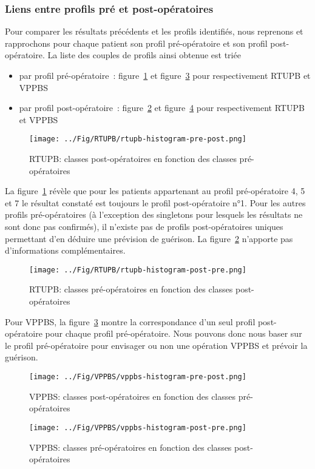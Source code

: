 %

\subsubsection{Liens entre profils pré et post-opératoires}

Pour comparer les résultats précédents et les profils identifiés, nous reprenons et rapprochons pour chaque patient son profil pré-opératoire et son profil post-opératoire. La liste des couples de profils ainsi obtenue
est triée
\begin{itemize}
 \item  par profil pré-opératoire~: figure~\ref{fig-rtupb-histogram} et figure~\ref{fig-vppbs-histogram} pour respectivement RTUPB et VPPBS
 \item  par profil post-opératoire~: figure~\ref{fig-rtupb-histogram2} et figure~\ref{fig-vppbs-histogram2} pour respectivement RTUPB et VPPBS
\end{itemize}

\begin{figure}[H]
\centering
\texttt{[image: ../Fig/RTUPB/rtupb-histogram-pre-post.png]}
\caption{RTUPB: classes post-opératoires en fonction des classes pré-opératoires}
\label{fig-rtupb-histogram}
\end{figure}

La figure~\ref{fig-rtupb-histogram} révèle que pour les patients appartenant au profil pré-opératoire 4, 5 et 7 le résultat constaté est toujours le profil post-opératoire n°1.  Pour les autres profils pré-opératoires (à l'exception des singletons pour lesquels les résultats ne sont donc pas confirmés), il n'existe pas de profils post-opératoires uniques permettant d'en déduire une prévision de guérison.
La figure~\ref{fig-rtupb-histogram2} n'apporte pas d'informations complémentaires.

\begin{figure}[H]
\centering
\texttt{[image: ../Fig/RTUPB/rtupb-histogram-post-pre.png]}
\caption[]{RTUPB: classes pré-opératoires en fonction des classes post-opératoires}
\label{fig-rtupb-histogram2}
\end{figure}

Pour VPPBS, la figure~\ref{fig-vppbs-histogram} montre la correspondance d'un seul profil post-opératoire pour chaque profil pré-opératoire. Nous pouvons donc nous baser sur le profil pré-opératoire pour envisager ou non une opération VPPBS et prévoir la guérison.

\begin{figure}[H]
\centering
\texttt{[image: ../Fig/VPPBS/vppbs-histogram-pre-post.png]}
\caption{VPPBS: classes post-opératoires en fonction des classes pré-opératoires}
\label{fig-vppbs-histogram}
\end{figure}

\begin{figure}[H]
\centering
\texttt{[image: ../Fig/VPPBS/vppbs-histogram-post-pre.png]}
\caption[]{VPPBS: classes pré-opératoires en fonction des classes post-opératoires}
\label{fig-vppbs-histogram2}
\end{figure}
